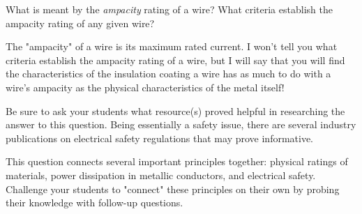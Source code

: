 

What is meant by the {\it ampacity} rating of a wire?  What criteria establish the ampacity rating of any given wire?







The "ampacity" of a wire is its maximum rated current.  I won't tell you what criteria establish the ampacity rating of a wire, but I will say that you will find the characteristics of the insulation coating a wire has as much to do with a wire's ampacity as the physical characteristics of the metal itself!







Be sure to ask your students what resource(s) proved helpful in researching the answer to this question.  Being essentially a safety issue, there are several industry publications on electrical safety regulations that may prove informative.

This question connects several important principles together: physical ratings of materials, power dissipation in metallic conductors, and electrical safety.  Challenge your students to "connect" these principles on their own by probing their knowledge with follow-up questions.




